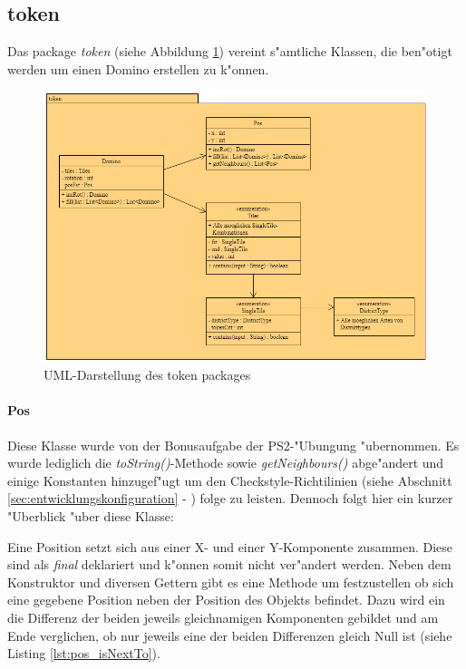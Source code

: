 \newpage
\subsection{token}
\label{ss:token}
Das package \emph{token} (siehe Abbildung \ref{fig:tokenPackage}) vereint s"amtliche Klassen, die ben"otigt werden um einen Domino erstellen zu k"onnen. 

\begin{figure}
	\centering
	\includegraphics{pics/tokenPackage}
	\caption{UML-Darstellung des token packages}
	\label{fig:tokenPackage}
\end{figure}

\paragraph{Pos}
\label{par:pos}
Diese Klasse wurde von der Bonusaufgabe der PS2-"Ubungung "ubernommen. Es wurde lediglich die  \emph{toString()}-Methode sowie \emph{getNeighbours()} abge"andert und einige Konstanten hinzugef"ugt um den Checkstyle-Richtilinien 
(siehe Abschnitt \ref{sec:entwicklungskonfiguration} - ) 
folge zu leisten. Dennoch folgt hier ein kurzer "Uberblick "uber diese Klasse: 

Eine Position setzt sich aus einer X- und einer Y-Komponente zusammen. Diese sind als \emph{final} deklariert und k"onnen somit nicht ver"andert werden. Neben dem Konstruktor und diversen Gettern gibt es eine Methode um festzustellen ob sich eine gegebene Position neben der Position des Objekts befindet. Dazu wird ein die Differenz der beiden jeweils gleichnamigen Komponenten gebildet und am Ende verglichen, ob nur jeweils eine der beiden Differenzen gleich Null ist (siehe Listing \ref{lst:pos_isNextTo}). 

